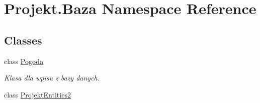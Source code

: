 \hypertarget{namespace_projekt_1_1_baza}{}\section{Projekt.\+Baza Namespace Reference}
\label{namespace_projekt_1_1_baza}
\subsection*{Classes}
\begin{DoxyCompactItemize}
\item 
class \mbox{\hyperlink{class_projekt_1_1_baza_1_1_pogoda}{Pogoda}}
\begin{DoxyCompactList}\small\item\em Klasa dla wpisu z bazy danych. \end{DoxyCompactList}\item 
class \mbox{\hyperlink{class_projekt_1_1_baza_1_1_projekt_entities2}{Projekt\+Entities2}}
\end{DoxyCompactItemize}
